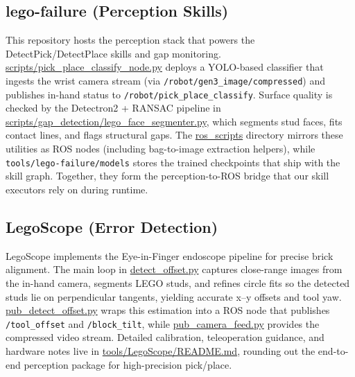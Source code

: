 \documentclass{article}
\begin{document}
\subsection{lego-failure (Perception Skills)}
This repository hosts the perception stack that powers the DetectPick/DetectPlace skills and gap monitoring. \href{https://github.com/intelligent-control-lab/AIDF/blob/main/tools/lego-failure/scripts/pick_place_classify_node.py#L1}{scripts/pick\_place\_classify\_node.py} deploys a YOLO-based classifier that ingests the wrist camera stream (via \texttt{/robot/gen3\_image/compressed}) and publishes in-hand status to \texttt{/robot/pick\_place\_classify}. Surface quality is checked by the Detectron2 + RANSAC pipeline in \href{https://github.com/intelligent-control-lab/AIDF/blob/main/tools/lego-failure/scripts/gap_detection/lego_face_segmenter.py#L1}{scripts/gap\_detection/lego\_face\_segmenter.py}, which segments stud faces, fits contact lines, and flags structural gaps. The \href{https://github.com/intelligent-control-lab/AIDF/blob/main/tools/lego-failure/ros_scripts}{ros\_scripts} directory mirrors these utilities as ROS nodes (including bag-to-image extraction helpers), while \texttt{tools/lego-failure/models} stores the trained checkpoints that ship with the skill graph. Together, they form the perception-to-ROS bridge that our skill executors rely on during runtime.

\subsection{LegoScope (Error Detection)}
LegoScope implements the Eye-in-Finger endoscope pipeline for precise brick alignment. The main loop in \href{https://github.com/intelligent-control-lab/AIDF/blob/main/tools/LegoScope/detect_offset.py#L1}{detect\_offset.py} captures close-range images from the in-hand camera, segments LEGO studs, and refines circle fits so the detected studs lie on perpendicular tangents, yielding accurate x--y offsets and tool yaw. \href{https://github.com/intelligent-control-lab/AIDF/blob/main/tools/LegoScope/pub_detect_offset.py#L1}{pub\_detect\_offset.py} wraps this estimation into a ROS node that publishes \texttt{/tool\_offset} and \texttt{/block\_tilt}, while \href{https://github.com/intelligent-control-lab/AIDF/blob/main/tools/LegoScope/pub_camera_feed.py#L1}{pub\_camera\_feed.py} provides the compressed video stream. Detailed calibration, teleoperation guidance, and hardware notes live in \href{https://github.com/intelligent-control-lab/AIDF/blob/main/tools/LegoScope/README.md}{tools/LegoScope/README.md}, rounding out the end-to-end perception package for high-precision pick/place.
\end{document}
